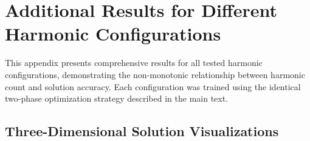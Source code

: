 \appendix

\section{Additional Results for Different Harmonic Configurations}

This appendix presents comprehensive results for all tested harmonic configurations, demonstrating the non-monotonic relationship between harmonic count and solution accuracy. Each configuration was trained using the identical two-phase optimization strategy described in the main text.

\subsection{Three-Dimensional Solution Visualizations}

